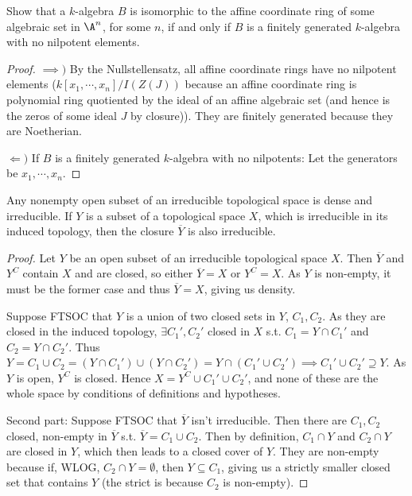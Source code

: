\documentclass[openany, amssymb, psamsfonts]{amsart}
\begin{document}
\begin{exercise}%
Show that a $k $-algebra $B $ is isomorphic to the affine coordinate ring of some algebraic set in $\A^n$, for some $n $, if and only if $B $ is a finitely generated $k $-algebra with no nilpotent elements.
\end{exercise}
\begin{proof}
	$\implies) $ By the Nullstellensatz, all affine coordinate rings have no nilpotent elements ($k[x_{1},\cdots,x_n] / I(Z(J)) $ because an affine coordinate ring is polynomial ring quotiented by the ideal of an affine algebraic set (and hence is the zeros of some ideal $J $ by closure)).
	They are finitely generated because they are Noetherian.

	$\Leftarrow) $ If $B $ is a finitely generated $k $-algebra with no nilpotents: 
	Let the generators be $x_{1},\cdots, x_n $.
\end{proof}

\begin{exercise}%
Any nonempty open subset of an irreducible topological space is dense and irreducible. If $Y $ is a subset of a topological space $X $, which is irreducible in its induced topology, then the closure $\overline{Y}  $ is also irreducible.
\end{exercise}
\begin{proof}
	Let $Y $ be an open subset of an irreducible topological space $X $.
	Then $\overline{Y}  $ and $Y^C $ contain $X $ and are closed, so either $\overline{Y} = X  $ or $Y^C = X $.
	As $Y $ is non-empty, it must be the former case and thus $\overline{Y} = X  $, giving us density.

	Suppose FTSOC that $Y $ is a union of two closed sets in $Y $, $C_{1},C_{2} $.
	As they are closed in the induced topology, $\exists C_{1}',C_{2}' $ closed in $X $ s.t. $C_{1} = Y \cap C_{1}' $ and $C_{2} = Y\cap C_{2}' $.
	Thus $Y = C_{1} \cup C_{2} = (Y\cap C_{1}') \cup (Y \cap C_{2}') = Y \cap (C_{1}'\cup C_{2}') \implies C_{1}'\cup C_{2}' \supseteq Y$.
	As $Y $ is open, $Y^C $ is closed.
	Hence $X = Y^C \cup C_{1}'\cup C_{2}' $, and none of these are the whole space by conditions of definitions and hypotheses.

	Second part:
	Suppose FTSOC that $\overline{Y}  $ isn't irreducible.
	Then there are $C_{1},C_{2} $ closed, non-empty in $\overline{Y}  $ s.t. $\overline{Y} = C_{1}\cup C_{2} $.
	Then by definition, $C_{1}\cap Y $ and $C_{2}\cap Y $ are closed in $Y $, which then leads to a closed cover of $Y $.
	They are non-empty because if, WLOG, $C_{2}\cap Y = \emptyset $, then $Y\subseteq C_{1} $, giving us a strictly smaller closed set that contains $Y $ (the strict is because $C_{2} $ is non-empty).
\end{proof}
\end{document}
